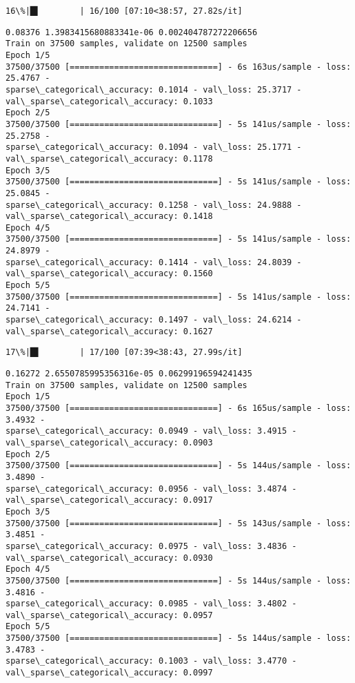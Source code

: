 \documentclass[11pt]{article}
\begin{document}
    \begin{Verbatim}[commandchars=\\\{\}]
 16\%|█▌        | 16/100 [07:10<38:57, 27.82s/it]
    \end{Verbatim}

    \begin{Verbatim}[commandchars=\\\{\}]
0.08376 1.3983415680883341e-06 0.002404787272206656
Train on 37500 samples, validate on 12500 samples
Epoch 1/5
37500/37500 [==============================] - 6s 163us/sample - loss: 25.4767 -
sparse\_categorical\_accuracy: 0.1014 - val\_loss: 25.3717 -
val\_sparse\_categorical\_accuracy: 0.1033
Epoch 2/5
37500/37500 [==============================] - 5s 141us/sample - loss: 25.2758 -
sparse\_categorical\_accuracy: 0.1094 - val\_loss: 25.1771 -
val\_sparse\_categorical\_accuracy: 0.1178
Epoch 3/5
37500/37500 [==============================] - 5s 141us/sample - loss: 25.0845 -
sparse\_categorical\_accuracy: 0.1258 - val\_loss: 24.9888 -
val\_sparse\_categorical\_accuracy: 0.1418
Epoch 4/5
37500/37500 [==============================] - 5s 141us/sample - loss: 24.8979 -
sparse\_categorical\_accuracy: 0.1414 - val\_loss: 24.8039 -
val\_sparse\_categorical\_accuracy: 0.1560
Epoch 5/5
37500/37500 [==============================] - 5s 141us/sample - loss: 24.7141 -
sparse\_categorical\_accuracy: 0.1497 - val\_loss: 24.6214 -
val\_sparse\_categorical\_accuracy: 0.1627
    \end{Verbatim}

    \begin{Verbatim}[commandchars=\\\{\}]
 17\%|█▋        | 17/100 [07:39<38:43, 27.99s/it]
    \end{Verbatim}

    \begin{Verbatim}[commandchars=\\\{\}]
0.16272 2.6550785995356316e-05 0.06299196594241435
Train on 37500 samples, validate on 12500 samples
Epoch 1/5
37500/37500 [==============================] - 6s 165us/sample - loss: 3.4932 -
sparse\_categorical\_accuracy: 0.0949 - val\_loss: 3.4915 -
val\_sparse\_categorical\_accuracy: 0.0903
Epoch 2/5
37500/37500 [==============================] - 5s 144us/sample - loss: 3.4890 -
sparse\_categorical\_accuracy: 0.0956 - val\_loss: 3.4874 -
val\_sparse\_categorical\_accuracy: 0.0917
Epoch 3/5
37500/37500 [==============================] - 5s 143us/sample - loss: 3.4851 -
sparse\_categorical\_accuracy: 0.0975 - val\_loss: 3.4836 -
val\_sparse\_categorical\_accuracy: 0.0930
Epoch 4/5
37500/37500 [==============================] - 5s 144us/sample - loss: 3.4816 -
sparse\_categorical\_accuracy: 0.0985 - val\_loss: 3.4802 -
val\_sparse\_categorical\_accuracy: 0.0957
Epoch 5/5
37500/37500 [==============================] - 5s 144us/sample - loss: 3.4783 -
sparse\_categorical\_accuracy: 0.1003 - val\_loss: 3.4770 -
val\_sparse\_categorical\_accuracy: 0.0997
    \end{Verbatim}
\end{document}
